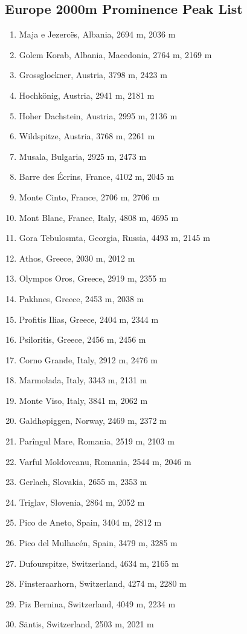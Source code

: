 \documentclass[10pt,twocolumn,letterpaper]{article}
\begin{document}
\subsection{Europe 2000m Prominence Peak List}
\begin{flushleft}
\begin{enumerate}
    \item Maja e Jezercës, Albania, 2694 m, 2036 m
    \item Golem Korab, Albania, Macedonia, 2764 m, 2169 m
    \item Grossglockner, Austria, 3798 m, 2423 m
    \item Hochkönig, Austria, 2941 m, 2181 m
    \item Hoher Dachstein, Austria, 2995 m, 2136 m
    \item Wildspitze, Austria, 3768 m, 2261 m
    \item Musala, Bulgaria, 2925 m, 2473 m
    \item Barre des Écrins, France, 4102 m, 2045 m
    \item Monte Cinto, France, 2706 m, 2706 m
    \item Mont Blanc, France, Italy, 4808 m, 4695 m
    \item Gora Tebulosmta, Georgia, Russia, 4493 m, 2145 m
    \item Athos, Greece, 2030 m, 2012 m
    \item Olympos Oros, Greece, 2919 m, 2355 m
    \item Pakhnes, Greece, 2453 m, 2038 m
    \item Profitis Ilias, Greece, 2404 m, 2344 m
    \item Psiloritis, Greece, 2456 m, 2456 m
    \item Corno Grande, Italy, 2912 m, 2476 m
    \item Marmolada, Italy, 3343 m, 2131 m
    \item Monte Viso, Italy, 3841 m, 2062 m
    \item Galdhøpiggen, Norway, 2469 m, 2372 m
    \item Parîngul Mare, Romania, 2519 m, 2103 m
    \item Varful Moldoveanu, Romania, 2544 m, 2046 m
    \item Gerlach, Slovakia, 2655 m, 2353 m
    \item Triglav, Slovenia, 2864 m, 2052 m
    \item Pico de Aneto, Spain, 3404 m, 2812 m
    \item Pico del Mulhacén, Spain, 3479 m, 3285 m
    \item Dufourspitze, Switzerland, 4634 m, 2165 m
    \item Finsteraarhorn, Switzerland, 4274 m, 2280 m
    \item Piz Bernina, Switzerland, 4049 m, 2234 m
    \item Säntis, Switzerland, 2503 m, 2021 m
\end{enumerate}
\end{flushleft}
\end{document}

